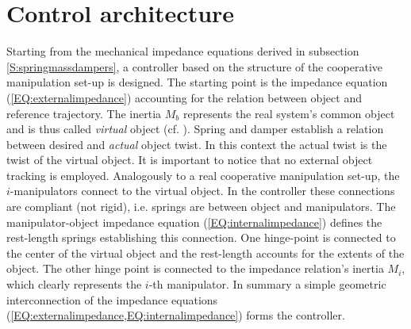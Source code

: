 \documentclass[a4paper,twoside, openright,12pt]{report}
\begin{document}
\section{Control architecture}
Starting from the mechanical impedance equations derived in subsection \ref{S:springmassdampers}, a controller based on the structure of the cooperative manipulation set-up is designed. The starting point is the impedance equation (\ref{EQ:externalimpedance}) accounting for the relation between object and reference trajectory. The inertia $M_b$ represents the real system's common object and is thus called \emph{virtual} object (cf. \cite{Stramigioli_01b}). Spring and damper establish a relation between desired and \emph{actual} object twist. In this context the actual twist is the twist of the virtual object. It is important to notice that no external object tracking is employed. Analogously to a real cooperative manipulation set-up, the $i$-manipulators connect to the virtual object. In the controller these connections are compliant (not rigid), i.e. springs are between object and manipulators. The manipulator-object impedance equation (\ref{EQ:internalimpedance}) defines the rest-length springs establishing this connection. One hinge-point is connected to the center of the virtual object and the rest-length accounts for the extents of the object. The other hinge point is connected to the impedance relation's inertia  $M_i$, which clearly represents the $i$-th manipulator. In summary a simple geometric interconnection of the impedance equations (\ref{EQ:externalimpedance,EQ:internalimpedance}) forms the controller.
\end{document}
